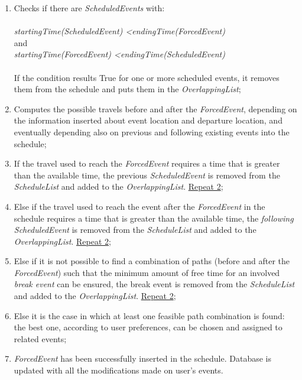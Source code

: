 \begin{enumerate}
	\item Checks if there are \textit{ScheduledEvents} with: \\\\ \textit{startingTime(ScheduledEvent) \textless endingTime(ForcedEvent)} \\ and \\ \textit{startingTime(ForcedEvent) \textless endingTime(ScheduledEvent)} \\\\
	If the condition results True for one or more scheduled events, it removes them from the schedule and puts them in the \textit{OverlappingList};
	\item Computes the possible travels before and after the \textit{ForcedEvent}, depending on the information inserted about event location and departure location, and eventually depending also on previous and following existing events into the schedule;
	\item If the travel used to reach the \textit{ForcedEvent} requires a time that is greater than the available time, the previous \textit{ScheduledEvent} is removed from the \textit{ScheduleList} and added to the \textit{OverlappingList}. \underline{Repeat 2};
	\item Else if the travel used to reach the event after the \textit{ForcedEvent} in the schedule requires a time that is greater than the available time, the \textit{following ScheduledEvent} is removed from the \textit{ScheduleList} and added to the \textit{OverlappingList}. \underline{Repeat 2};
	\item Else if it is not possible to find a combination of paths (before and after the \textit{ForcedEvent}) such that the minimum amount of free time for an involved \textit{break event} can be ensured, the break event is removed from the \textit{ScheduleList} and added to the \textit{OverlappingList}. \underline{Repeat 2};
	\item Else it is the case in which at least one feasible path combination is found: the best one, according to user preferences, can be chosen and assigned to related events;
	\item \textit{ForcedEvent} has been successfully inserted in the schedule. Database is updated with all the modifications made on user’s events.
\end{enumerate}
